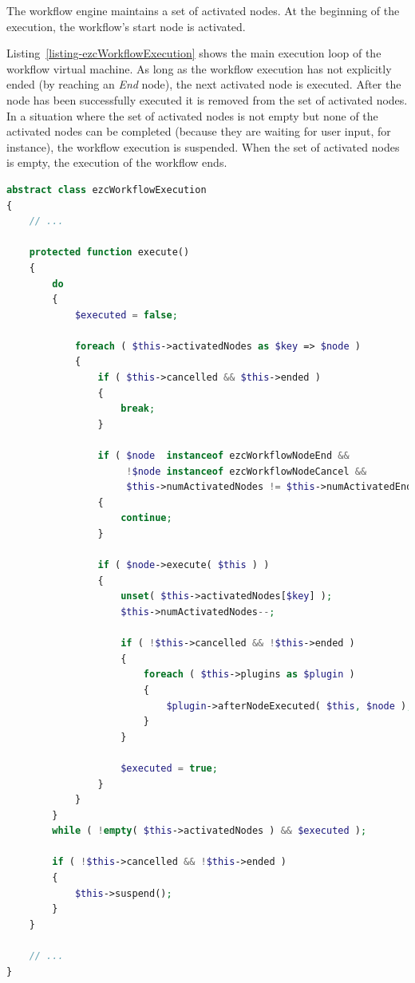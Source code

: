The workflow engine maintains a set of activated nodes. At the beginning of
the execution, the workflow's start node is activated.

Listing~\ref{listing-ezcWorkflowExecution} shows the main execution loop of
the workflow virtual machine. As long as the workflow execution has not
explicitly ended (by reaching an \emph{End} node), the next activated node
is executed. After the node has been successfully executed it is removed from
the set of activated nodes. In a situation where the set of activated nodes
is not empty but none of the activated nodes can be completed (because they are
waiting for user input, for instance), the workflow execution is suspended.
When the set of activated nodes is empty, the execution of the workflow ends.

\begin{lstlisting}[language=PHP,float,caption={The workflow engine's main execution loop},label=listing-ezcWorkflowExecution]
abstract class ezcWorkflowExecution
{
    // ...

    protected function execute()
    {
        do
        {
            $executed = false;

            foreach ( $this->activatedNodes as $key => $node )
            {
                if ( $this->cancelled && $this->ended )
                {
                    break;
                }

                if ( $node  instanceof ezcWorkflowNodeEnd &&
                     !$node instanceof ezcWorkflowNodeCancel &&
                     $this->numActivatedNodes != $this->numActivatedEndNodes )
                {
                    continue;
                }

                if ( $node->execute( $this ) )
                {
                    unset( $this->activatedNodes[$key] );
                    $this->numActivatedNodes--;

                    if ( !$this->cancelled && !$this->ended )
                    {
                        foreach ( $this->plugins as $plugin )
                        {
                            $plugin->afterNodeExecuted( $this, $node );
                        }
                    }

                    $executed = true;
                }
            }
        }
        while ( !empty( $this->activatedNodes ) && $executed );

        if ( !$this->cancelled && !$this->ended )
        {
            $this->suspend();
        }
    }

    // ...
}
\end{lstlisting}

